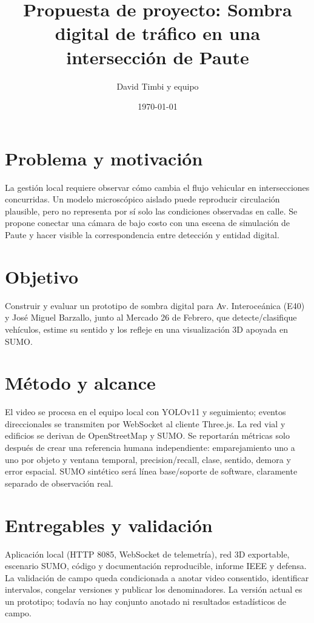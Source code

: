 \documentclass[10pt]{article}
\title{Propuesta de proyecto: Sombra digital de tráfico en una intersección de Paute}
\author{David Timbi y equipo}
\date{\today}
\begin{document}
\maketitle
\section*{Problema y motivación}
La gestión local requiere observar cómo cambia el flujo vehicular en intersecciones concurridas. Un modelo microscópico aislado puede reproducir circulación plausible, pero no representa por sí solo las condiciones observadas en calle. Se propone conectar una cámara de bajo costo con una escena de simulación de Paute y hacer visible la correspondencia entre detección y entidad digital.
\section*{Objetivo}
Construir y evaluar un prototipo de sombra digital para Av. Interoceánica (E40) y José Miguel Barzallo, junto al Mercado 26 de Febrero, que detecte/clasifique vehículos, estime su sentido y los refleje en una visualización 3D apoyada en SUMO.
\section*{Método y alcance}
El video se procesa en el equipo local con YOLOv11 y seguimiento; eventos direccionales se transmiten por WebSocket al cliente Three.js. La red vial y edificios se derivan de OpenStreetMap y SUMO. Se reportarán métricas solo después de crear una referencia humana independiente: emparejamiento uno a uno por objeto y ventana temporal, precision/recall, clase, sentido, demora y error espacial. SUMO sintético será línea base/soporte de software, claramente separado de observación real.
\section*{Entregables y validación}
Aplicación local (HTTP 8085, WebSocket de telemetría), red 3D exportable, escenario SUMO, código y documentación reproducible, informe IEEE y defensa. La validación de campo queda condicionada a anotar video consentido, identificar intervalos, congelar versiones y publicar los denominadores. La versión actual es un prototipo; todavía no hay conjunto anotado ni resultados estadísticos de campo.
\end{document}
